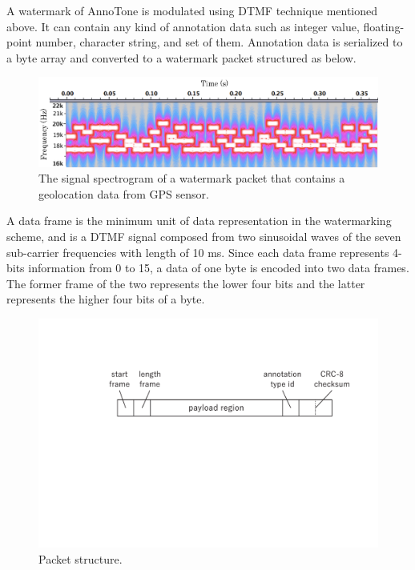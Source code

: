 A watermark of AnnoTone is modulated using DTMF technique mentioned above.
It can contain any kind of annotation data such as integer value, floating-point number, character string, and set of them.
Annotation data is serialized to a byte array and converted to a watermark packet structured as below.

\begin{figure}[htbp]
 \begin{center}
  \includegraphics[width=120mm]{watermarking_spectrogram.png}
 \end{center}
 \caption{The signal spectrogram of a watermark packet that contains a geolocation data from GPS sensor.}
 \label{fig:watr_spec}
\end{figure}

A data frame is the minimum unit of data representation in the watermarking scheme, and is a DTMF signal composed from two sinusoidal waves of the seven sub-carrier frequencies with length of 10 ms.
Since each data frame represents 4-bits information from 0 to 15, a data of one byte is encoded into two data frames.
The former frame of the two represents the lower four bits and the latter represents the higher four bits of a byte.

\begin{figure}[htbp]
 \begin{center}
  \vspace{5mm}
  \includegraphics[width=120mm]{watermarking_packet.pdf}
 \end{center}
 \caption{Packet structure.}
 \label{fig:watr_pack}
\end{figure}

